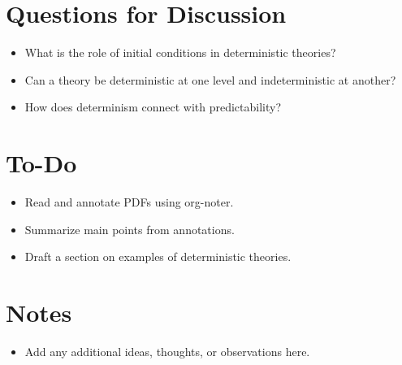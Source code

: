 \documentclass[11pt]{article}
\begin{document}
\section{Questions for Discussion}
\label{sec:orgf460118}
\begin{itemize}
\item What is the role of initial conditions in deterministic theories?
\item Can a theory be deterministic at one level and indeterministic at another?
\item How does determinism connect with predictability?
\end{itemize}

\section{To-Do}
\label{sec:org60e0268}
\begin{itemize}
\item[{$\square$}] Read and annotate PDFs using org-noter.
\item[{$\square$}] Summarize main points from annotations.
\item[{$\square$}] Draft a section on examples of deterministic theories.
\end{itemize}

\section{Notes}
\label{sec:org9760241}
\begin{itemize}
\item Add any additional ideas, thoughts, or observations here.
\end{itemize}
\end{document}

